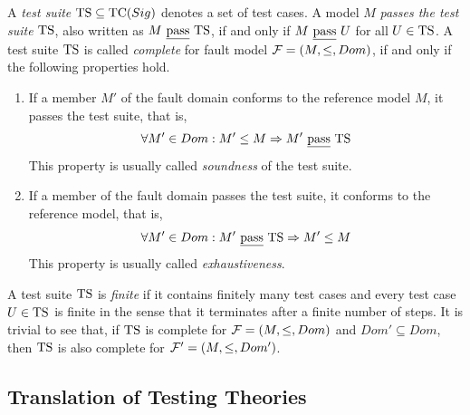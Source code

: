 A \emph{test suite} ${\text{TS}} \subseteq {\text{TC}}(Sig)$ denotes  a set of test cases.
A model $M$ \emph{passes the test suite} ${\text{TS}}$, also written as $M\ \underline{\text{pass}}\ {\text{TS}}$,
if and only if $M\ \underline{\text{pass}}\ U$ for all $U\in {\text{TS}}$. A test suite ${\text{TS}}$ is called \emph{complete} for fault model ${\cal F} = (M,\le,Dom)$, if and only if the following properties hold.
\begin{enumerate}
\item If a member $M'$ of the fault domain  conforms to the reference model $M$, 
it passes the test suite, that is,
$$
\forall M'\in Dom: M'\le M \Rightarrow M'\ \underline{\text{pass}}\ {\text{TS}}
$$
This property is usually called \emph{soundness} of the test suite.

\item If a member of the fault domain passes the test suite, it conforms to the reference model, that is,
$$
\forall M'\in Dom: M'\ \underline{\text{pass}}\ {\text{TS}} \Rightarrow M'\le M
$$
This property is usually called \emph{exhaustiveness}.
\end{enumerate}
A test suite ${\text{TS}}$ is \emph{finite} if it contains finitely many test cases and every test
case $U\in{\text{TS}}$ is finite in the sense that it terminates after a finite number of steps.
It is trivial to see that, if ${\text{TS}}$ is complete  for   ${\cal F} = (M,\le,Dom)$
and $Dom'\subseteq Dom$, then ${\text{TS}}$ is also complete for ${\cal F}' = (M,\le,Dom')$.





\subsection{Translation of Testing Theories}
\label{sec:transltt}

